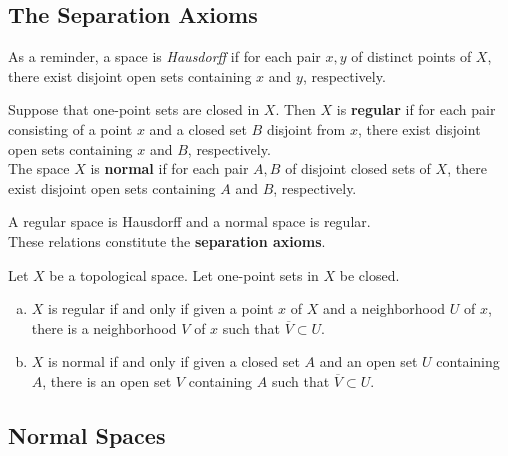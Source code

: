 \subsection{The Separation Axioms}

As a reminder, a space is \textit{Hausdorff} if for each pair $x, y$ of distinct points of $X$, there exist disjoint 
open sets containing $x$ and $y$, respectively. 

\begin{definition}
Suppose that one-point sets are closed in $X$. Then $X$ is \textbf{regular} if for each pair consisting of a point $x$ and a closed set $B$ disjoint from $x$,
there exist disjoint open sets containing $x$ and $B$, respectively. \\

The space $X$ is \textbf{normal} if for each pair $A, B$ of disjoint closed sets of $X$, there exist disjoint open sets containing $A$ and $B$, respectively.
\end{definition}

\begin{remark}
A regular space is Hausdorff and a normal space is regular. \\

These relations constitute the \textbf{separation axioms}.
\end{remark}

\begin{lemma}
Let $X$ be a topological space. Let one-point sets in $X$ be closed.
\begin{enumerate}[a)]
    \item $X$ is regular if and only if given a point $x$ of $X$ and a neighborhood $U$ of $x$, there is a neighborhood $V$ of $x$ such that $\overline{V} \subset U$.
    \item $X$ is normal if and only if given a closed set $A$ and an open set $U$ containing $A$, there is an open set $V$ containing $A$ such that $\overline{V} \subset U$.
\end{enumerate}
\end{lemma}

\subsection{Normal Spaces}


